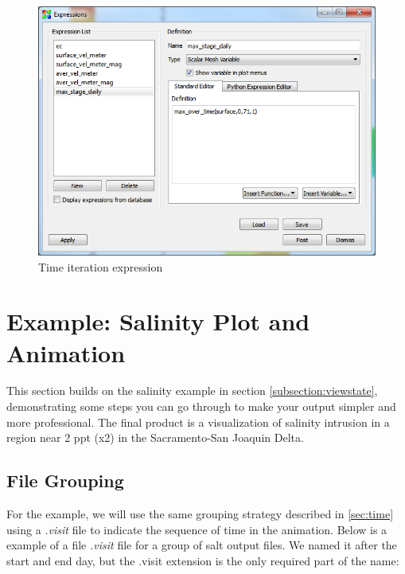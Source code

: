 \documentclass[12pt]{report}
\begin{document}
\begin{figure}
\begin{center}
\includegraphics{timeExpression}
\caption{Time iteration expression }
\label{figure:timeExpression}
\end{center}
\end{figure} 







\chapter{Example: Salinity Plot and Animation}
	
This section builds on the salinity example in section \ref{subsection:viewstate},
demonstrating some steps you can go through to make your output 
simpler and more professional. The final product is a visualization of salinity
intrusion in a region near 2 ppt (x2) in the Sacramento-San Joaquin Delta. 

\section{File Grouping}
	
For the example, we will use the same grouping strategy described in \ref{sec:time} 
using a \emph{.visit} file to indicate the sequence of time in the  animation. 
Below is a example of a file \emph{.visit} file for a group of salt output files. 
We named it after the start and end day, but the .visit extension is the only required 
part of the name:
		
\end{document}
